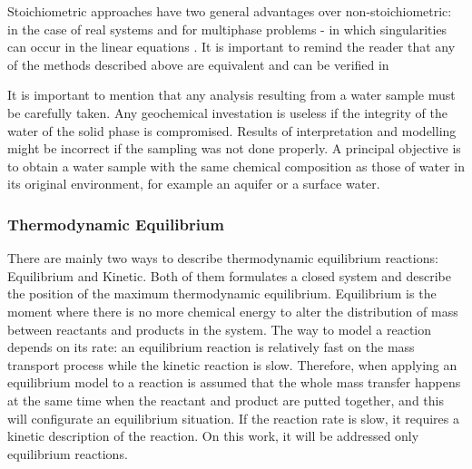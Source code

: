\documentclass[ppgc,mestrado,english]{iiufrgs}
\begin{document}
Stoichiometric approaches have two general advantages over non-stoichiometric: in the case of real systems and for multiphase problems - in which singularities can occur in the linear equations \cite{Smith:80}. It is important to remind the reader that any of the methods described above are equivalent and can be verified in \cite{Zeggeren:70}

It is important to mention that any analysis resulting from a water sample must be carefully taken. Any geochemical investation is useless if the integrity of the water of the solid phase is compromised. Results of interpretation and modelling might be incorrect if the sampling was not done properly. A principal objective is to obtain a water sample with the same chemical composition as those of water in its original environment, for example an aquifer or a surface water. \cite{Deutsch:97}

\subsubsection{Thermodynamic Equilibrium}
There are mainly two ways to describe thermodynamic equilibrium reactions: Equilibrium and Kinetic. Both of them formulates a closed system and describe the position of the maximum thermodynamic equilibrium. Equilibrium is the moment where there is no more chemical energy to alter the distribution of mass between reactants and products in the system. The way to model a reaction depends on its rate: an equilibrium reaction is relatively fast on the mass transport process while the kinetic reaction is slow. Therefore, when applying an equilibrium model to a reaction is assumed that the whole mass transfer happens at the same time when the reactant and product are putted together, and this will configurate an equilibrium situation. If the reaction rate is slow, it requires a kinetic description of the reaction. On this work, it will be addressed only equilibrium reactions.  \cite{Nordstrom:86}
\end{document}
